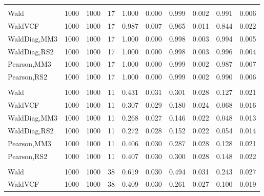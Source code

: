 \documentclass[
]{article}
\begin{document}
\begin{table}[H]
{\begin{tabular}[t]{lrrrrrrlrr}
\addlinespace[0.3em]
\multicolumn{10}{l}{\textbf{1F 15V}}\\
\hspace{1em}Wald & 1000 & 1000 & 17 & 1.000 & 0.000 & 0.999 & 0.002 & 0.991 & 0.006\\
\hspace{1em}WaldVCF & 1000 & 1000 & 17 & 0.987 & 0.007 & 0.965 & 0.011 & 0.844 & 0.022\\
\hspace{1em}WaldDiag,MM3 & 1000 & 1000 & 17 & 1.000 & 0.000 & 0.998 & 0.003 & 0.994 & 0.005\\
\hspace{1em}WaldDiag,RS2 & 1000 & 1000 & 17 & 1.000 & 0.000 & 0.998 & 0.003 & 0.996 & 0.004\\
\hspace{1em}Pearson,MM3 & 1000 & 1000 & 17 & 1.000 & 0.000 & 0.999 & 0.002 & 0.987 & 0.007\\
\hspace{1em}Pearson,RS2 & 1000 & 1000 & 17 & 1.000 & 0.000 & 0.999 & 0.002 & 0.990 & 0.006\\
\addlinespace[0.3em]
\multicolumn{10}{l}{\textbf{2F 10V}}\\
\hspace{1em}Wald & 1000 & 1000 & 11 & 0.431 & 0.031 & 0.301 & 0.028 & 0.127 & 0.021\\
\hspace{1em}WaldVCF & 1000 & 1000 & 11 & 0.307 & 0.029 & 0.180 & 0.024 & 0.068 & 0.016\\
\hspace{1em}WaldDiag,MM3 & 1000 & 1000 & 11 & 0.268 & 0.027 & 0.146 & 0.022 & 0.048 & 0.013\\
\hspace{1em}WaldDiag,RS2 & 1000 & 1000 & 11 & 0.272 & 0.028 & 0.152 & 0.022 & 0.054 & 0.014\\
\hspace{1em}Pearson,MM3 & 1000 & 1000 & 11 & 0.406 & 0.030 & 0.287 & 0.028 & 0.128 & 0.021\\
\hspace{1em}Pearson,RS2 & 1000 & 1000 & 11 & 0.407 & 0.030 & 0.300 & 0.028 & 0.148 & 0.022\\
\addlinespace[0.3em]
\multicolumn{10}{l}{\textbf{3F 15V}}\\
\hspace{1em}Wald & 1000 & 1000 & 38 & 0.619 & 0.030 & 0.494 & 0.031 & 0.243 & 0.027\\
\hspace{1em}WaldVCF & 1000 & 1000 & 38 & 0.409 & 0.030 & 0.261 & 0.027 & 0.100 & 0.019\\

\end{tabular}}
\end{table}
\end{document}
